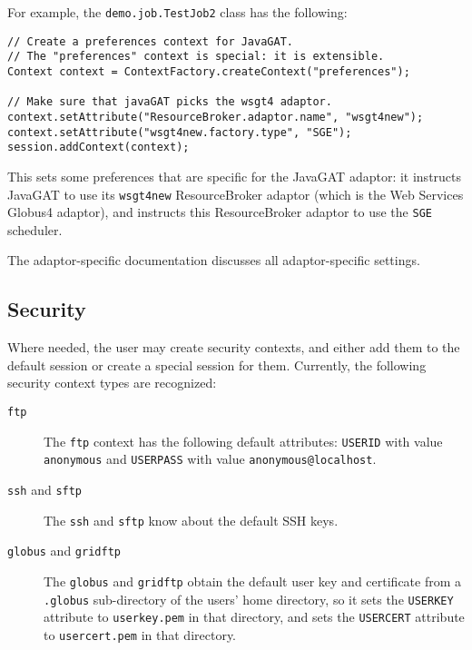 \documentclass[a4paper,10pt]{article}
\begin{document}
For example, the \texttt{demo.job.TestJob2} class has the following:
{\small
\begin{verbatim}
// Create a preferences context for JavaGAT.
// The "preferences" context is special: it is extensible.
Context context = ContextFactory.createContext("preferences");

// Make sure that javaGAT picks the wsgt4 adaptor.
context.setAttribute("ResourceBroker.adaptor.name", "wsgt4new");
context.setAttribute("wsgt4new.factory.type", "SGE");
session.addContext(context);
\end{verbatim}
}
\noindent
This sets some preferences that are specific for the JavaGAT adaptor:
it instructs JavaGAT to use its \texttt{wsgt4new} ResourceBroker adaptor
(which is the Web Services Globus4 adaptor), and instructs this
ResourceBroker adaptor to use the \texttt{SGE} scheduler.

The adaptor-specific documentation discusses all adaptor-specific
settings.

\subsection{Security}

Where needed, the user may create security contexts, and either add them
to the default session or create a special session for them.
Currently, the following security context types are recognized:

\begin{description}

\item[\texttt{ftp}]
The \texttt{ftp} context has the following default attributes:
\texttt{USERID} with value \texttt{anonymous} and \texttt{USERPASS} with
value \texttt{anonymous@localhost}.

\item[\texttt{ssh} and \texttt{sftp}]
The \texttt{ssh} and \texttt{sftp} know about the default SSH keys.

\item[\texttt{globus} and \texttt{gridftp}]
The \texttt{globus} and \texttt{gridftp} obtain the default user key
and certificate from a \texttt{.globus} sub-directory of the users' home
directory, so it sets the \texttt{USERKEY} attribute to \texttt{userkey.pem}
in that directory, and sets the \texttt{USERCERT} attribute to
\texttt{usercert.pem} in that directory.

\end{description}
\end{document}
